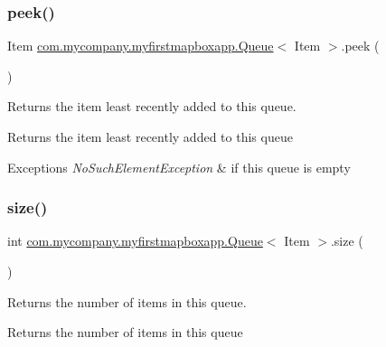 \subsubsection{\texorpdfstring{peek()}{peek()}}
{\footnotesize\ttfamily Item \hyperlink{classcom_1_1mycompany_1_1myfirstmapboxapp_1_1_queue}{com.\+mycompany.\+myfirstmapboxapp.\+Queue}$<$ Item $>$.peek (\begin{DoxyParamCaption}{ }\end{DoxyParamCaption})\hspace{0.3cm}{\ttfamily [inline]}}

Returns the item least recently added to this queue.

\begin{DoxyReturn}{Returns}
the item least recently added to this queue 
\end{DoxyReturn}

\begin{DoxyExceptions}{Exceptions}
{\em No\+Such\+Element\+Exception} & if this queue is empty \\
\hline
\end{DoxyExceptions}
\mbox{\label{classcom_1_1mycompany_1_1myfirstmapboxapp_1_1_queue_a5f04295747159659edc9f7c0460b675b}} 
\subsubsection{\texorpdfstring{size()}{size()}}
{\footnotesize\ttfamily int \hyperlink{classcom_1_1mycompany_1_1myfirstmapboxapp_1_1_queue}{com.\+mycompany.\+myfirstmapboxapp.\+Queue}$<$ Item $>$.size (\begin{DoxyParamCaption}{ }\end{DoxyParamCaption})\hspace{0.3cm}{\ttfamily [inline]}}

Returns the number of items in this queue.

\begin{DoxyReturn}{Returns}
the number of items in this queue 
\end{DoxyReturn}
\mbox{\label{classcom_1_1mycompany_1_1myfirstmapboxapp_1_1_queue_ab1f1a432abb3c2b451746a56f591a241}} 
